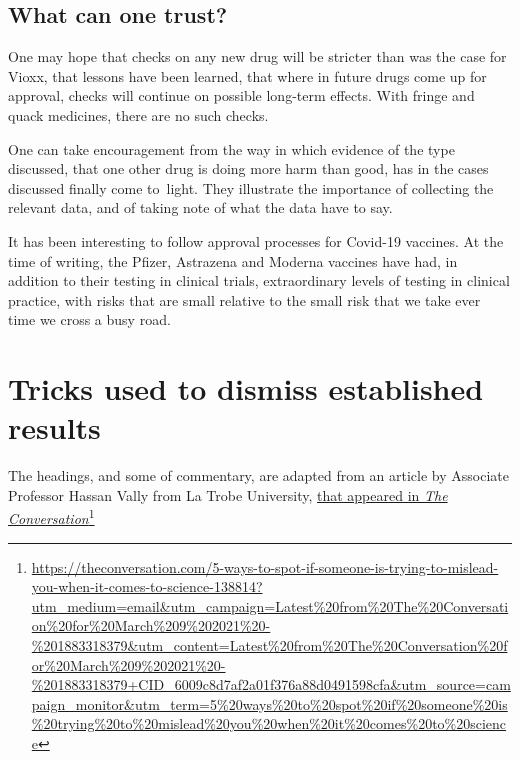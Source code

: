 \documentclass[
  10pt,
  b5paper]{book}
\begin{document}
\hypertarget{what-can-one-trust}{%
\subsection*{What can one trust?}\label{what-can-one-trust}}

One may hope that checks on any new drug will be
stricter than was the case for Vioxx, that lessons
have been learned, that where in future drugs come
up for approval, checks will continue on possible
long-term effects. With fringe and quack medicines,
there are no such checks.

One can take encouragement from the way in which
evidence of the type discussed, that one other drug
is doing more harm than good, has in the cases
discussed finally come to~light. They illustrate
the importance of collecting the relevant data, and
of taking note of what the data have to say.

It has been interesting to follow approval processes
for Covid-19 vaccines. At the time of writing, the
Pfizer, Astrazena and Moderna vaccines have had, in
addition to their testing in clinical trials,
extraordinary levels of testing in clinical practice,
with risks that are small relative to the small risk
that we take ever time we cross a busy road.

\hypertarget{tricks-used-to-dismiss-established-results}{%
\section{Tricks used to dismiss established results}\label{tricks-used-to-dismiss-established-results}}

The headings, and some of commentary, are adapted from an article by
Associate Professor Hassan Vally from La Trobe University,
\href{https://theconversation.com/5-ways-to-spot-if-someone-is-trying-to-mislead-you-when-it-comes-to-science-138814?utm_medium=email\&utm_campaign=Latest\%20from\%20The\%20Conversation\%20for\%20March\%209\%202021\%20-\%201883318379\&utm_content=Latest\%20from\%20The\%20Conversation\%20for\%20March\%209\%202021\%20-\%201883318379+CID_6009c8d7af2a01f376a88d0491598cfa\&utm_source=campaign_monitor\&utm_term=5\%20ways\%20to\%20spot\%20if\%20someone\%20is\%20trying\%20to\%20mislead\%20you\%20when\%20it\%20comes\%20to\%20science}{that appeared in \emph{The Conversation}}\footnote{\url{https://theconversation.com/5-ways-to-spot-if-someone-is-trying-to-mislead-you-when-it-comes-to-science-138814?utm_medium=email\&utm_campaign=Latest\%20from\%20The\%20Conversation\%20for\%20March\%209\%202021\%20-\%201883318379\&utm_content=Latest\%20from\%20The\%20Conversation\%20for\%20March\%209\%202021\%20-\%201883318379+CID_6009c8d7af2a01f376a88d0491598cfa\&utm_source=campaign_monitor\&utm_term=5\%20ways\%20to\%20spot\%20if\%20someone\%20is\%20trying\%20to\%20mislead\%20you\%20when\%20it\%20comes\%20to\%20science}}
\end{document}
